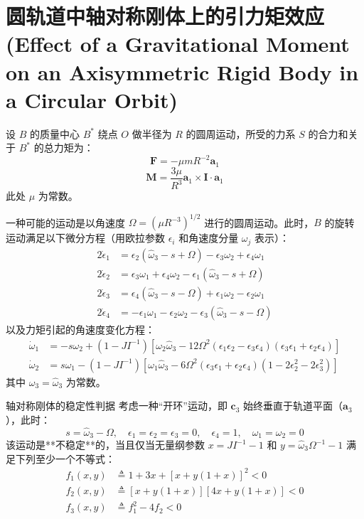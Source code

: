 \section{圆轨道中轴对称刚体上的引力矩效应 (Effect of a Gravitational Moment on an Axisymmetric Rigid Body in a Circular Orbit)}

设 \(B\) 的质量中心 \(B^*\) 绕点 \(O\) 做半径为 \(R\) 的圆周运动，所受的力系 \(S\) 的合力和关于 \(B^*\) 的总力矩为：
\begin{equation}
\mathbf{F} = -\mu m R^{-2}\mathbf{a}_1 \tag{1}
\end{equation}
\begin{equation}
\mathbf{M} = \frac{3\mu}{R^3}\mathbf{a}_1 \times \mathbf{I} \cdot \mathbf{a}_1 \tag{2}
\end{equation}
此处 \(\mu\) 为常数。

一种可能的运动是以角速度 \(\Omega = (\mu R^{-3})^{1/2}\) 进行的圆周运动。此时，\(B\) 的旋转运动满足以下微分方程（用欧拉参数 \(\epsilon_i\) 和角速度分量 \(\omega_j\) 表示）：
\begin{align}
2\dot{\epsilon}_1 &= \epsilon_2(\hat{\omega}_3 - s + \Omega) - \epsilon_3\omega_2 + \epsilon_4\omega_1 \tag{4} \\
2\dot{\epsilon}_2 &= \epsilon_3\omega_1 + \epsilon_4\omega_2 - \epsilon_1(\hat{\omega}_3 - s + \Omega) \tag{5} \\
2\dot{\epsilon}_3 &= \epsilon_4(\hat{\omega}_3 - s - \Omega) + \epsilon_1\omega_2 - \epsilon_2\omega_1 \tag{6} \\
2\dot{\epsilon}_4 &= -\epsilon_1\omega_1 - \epsilon_2\omega_2 - \epsilon_3(\hat{\omega}_3 - s - \Omega) \tag{7}
\end{align}
以及力矩引起的角速度变化方程：
\begin{align}
\dot{\omega}_1 &= -s\omega_2 + (1 - JI^{-1})\left[\omega_2\hat{\omega}_3 - 12\Omega^2(\epsilon_1\epsilon_2 - \epsilon_3\epsilon_4)(\epsilon_3\epsilon_1 + \epsilon_2\epsilon_4)\right] \tag{8} \\
\dot{\omega}_2 &= s\omega_1 - (1 - JI^{-1})\left[\omega_1\hat{\omega}_3 - 6\Omega^2(\epsilon_3\epsilon_1 + \epsilon_2\epsilon_4)(1 - 2\epsilon_2^2 - 2\epsilon_3^2)\right] \tag{9}
\end{align}
其中 \(\omega_3 = \hat{\omega}_3\) 为常数。

\begin{myTheorem}{轴对称刚体的稳定性判据}
考虑一种“开环”运动，即 \(\mathbf{c}_3\) 始终垂直于轨道平面（\(\mathbf{a}_3\)），此时：
\begin{equation}
s = \hat{\omega}_3 - \Omega, \quad \epsilon_1 = \epsilon_2 = \epsilon_3 = 0, \quad \epsilon_4 = 1, \quad \omega_1 = \omega_2 = 0 \tag{18}
\end{equation}
该运动是**不稳定**的，当且仅当无量纲参数 \(x = JI^{-1} - 1\) 和 \(y = \hat{\omega}_3\Omega^{-1} - 1\) 满足下列至少一个不等式：
\begin{align}
f_1(x,y) &\triangleq 1 + 3x + [x + y(1 + x)]^2 < 0 \tag{19} \\
f_2(x,y) &\triangleq [x + y(1 + x)][4x + y(1 + x)] < 0 \tag{20} \\
f_3(x,y) &\triangleq f_1^2 - 4f_2 < 0 \tag{21}
\end{align}
\end{myTheorem}

